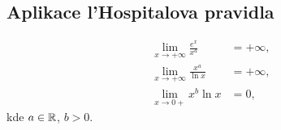 \documentclass[columns=2]{cheatsheet}
\begin{document}
\subsection{Aplikace l'Hospitalova pravidla}
\begin{align*}
  \lim_{x \to + \infty} \frac{e^x}{x^{a}} 
  &= 
  + \infty,
  \\
  \lim_{x \to + \infty} \frac{x^a}{\ln x}
  &=
  + \infty,
  \\
  \lim_{x \to 0+} x^b \ln x
  &=
  0,
\end{align*}
kde $a \in \mathbb{R}$, $b > 0$.

\end{document}
